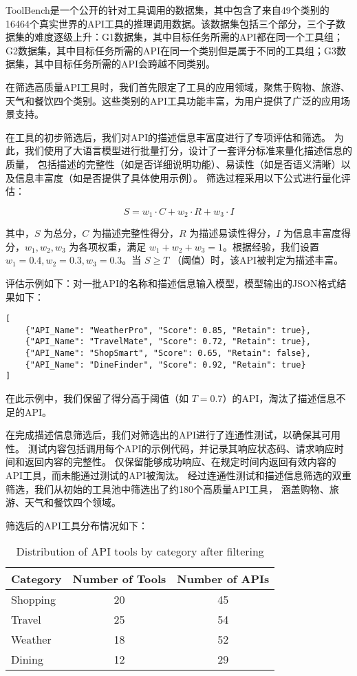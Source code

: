 ToolBench\cite{Qin2023}是一个公开的针对工具调用的数据集，其中包含了来自49个类别的16464个真实世界的API工具的推理调用数据。该数据集包括三个部分，三个子数据集的难度逐级上升：G1数据集，其中目标任务所需的API都在同一个工具组；G2数据集，其中目标任务所需的API在同一个类别但是属于不同的工具组；G3数据集，其中目标任务所需的API会跨越不同类别。

在筛选高质量API工具时，我们首先限定了工具的应用领域，聚焦于购物、旅游、天气和餐饮四个类别。这些类别的API工具功能丰富，为用户提供了广泛的应用场景支持。

在工具的初步筛选后，我们对API的描述信息丰富度进行了专项评估和筛选。
为此，我们使用了大语言模型进行批量打分，设计了一套评分标准来量化描述信息的质量，
包括描述的完整性（如是否详细说明功能）、易读性（如是否语义清晰）以及信息丰富度（如是否提供了具体使用示例）。
筛选过程采用以下公式进行量化评估：

\[
S = w_1 \cdot C + w_2 \cdot R + w_3 \cdot I
\]

其中，\( S \) 为总分，\( C \) 为描述完整性得分，\( R \) 为描述易读性得分，\( I \) 为信息丰富度得分，\( w_1, w_2, w_3 \) 为各项权重，满足 \( w_1 + w_2 + w_3 = 1 \)。根据经验，我们设置 \( w_1 = 0.4, w_2 = 0.3, w_3 = 0.3 \)。当 \( S \geq T \) （阈值）时，该API被判定为描述丰富。

评估示例如下：对一批API的名称和描述信息输入模型，模型输出的JSON格式结果如下：

\begin{verbatim}
[
    {"API_Name": "WeatherPro", "Score": 0.85, "Retain": true},
    {"API_Name": "TravelMate", "Score": 0.72, "Retain": true},
    {"API_Name": "ShopSmart", "Score": 0.65, "Retain": false},
    {"API_Name": "DineFinder", "Score": 0.92, "Retain": true}
]
\end{verbatim}

在此示例中，我们保留了得分高于阈值（如 \( T = 0.7 \)）的API，淘汰了描述信息不足的API。

在完成描述信息筛选后，我们对筛选出的API进行了连通性测试，以确保其可用性。
测试内容包括调用每个API的示例代码，并记录其响应状态码、请求响应时间和返回内容的完整性。
仅保留能够成功响应、在规定时间内返回有效内容的API工具，而未能通过测试的API被淘汰。
经过连通性测试和描述信息筛选的双重筛选，我们从初始的工具池中筛选出了约180个高质量API工具，
涵盖购物、旅游、天气和餐饮四个领域。

筛选后的API工具分布情况如下：

\begin{table}[h]
  \centering
  \caption{Distribution of API tools by category after filtering}
  \label{tab:api_distribution}
  \begin{tabular}{l|c|c}
  \toprule
  \textbf{Category} & \textbf{Number of Tools} & \textbf{Number of APIs} \\ \midrule
  Shopping & 20 & 45 \\ \hline
  Travel   & 25 & 54 \\ \hline
  Weather  & 18 & 52 \\ \hline
  Dining   & 12 & 29 \\ 
  \bottomrule
  \end{tabular}
\end{table}

